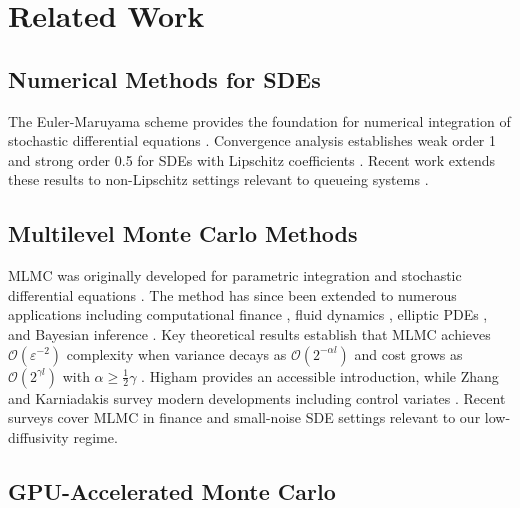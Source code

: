 \documentclass[pdflatex,sn-mathphys-num]{sn-jnl}
\theoremstyle{thmstyleone}%
\theoremstyle{thmstyletwo}%
\theoremstyle{thmstylethree}%
\begin{document}
\section{Related Work}

\subsection{Numerical Methods for SDEs}

The Euler-Maruyama scheme provides the foundation for numerical integration of stochastic
differential equations \cite{kloeden1992}. Convergence analysis establishes weak order 1 and
strong order 0.5 for SDEs with Lipschitz coefficients \cite{khasminskii2012}. Recent work
extends these results to non-Lipschitz settings relevant to queueing systems \cite{bossy2021}.

\subsection{Multilevel Monte Carlo Methods}

MLMC was originally developed for parametric integration \cite{heinrich2001multilevel} and
stochastic differential equations \cite{giles2008multilevel}. The method has since been extended
to numerous applications including computational finance \cite{giles2012finance,glasserman2003monte},
fluid dynamics \cite{mishra2012sparse}, elliptic PDEs \cite{cliffe2015}, and Bayesian inference
\cite{dodwell2015hierarchical}. Key theoretical results establish that MLMC achieves
$\mathcal{O}(\varepsilon^{-2})$ complexity when variance decays as $\mathcal{O}(2^{-\alpha l})$
and cost grows as $\mathcal{O}(2^{\gamma l})$ with $\alpha \geq \frac{1}{2}\gamma$
\cite{giles2015multilevel}. Higham \cite{higham2015} provides an accessible introduction, while
Zhang and Karniadakis \cite{zhang2020} survey modern developments including control variates
\cite{hickernell2005,lapeyre2003}. Recent surveys cover MLMC in finance \cite{giles2024review}
and small-noise SDE settings \cite{spiliopoulos2022multilevel} relevant to our low-diffusivity
regime.

\subsection{GPU-Accelerated Monte Carlo}
\end{document}
